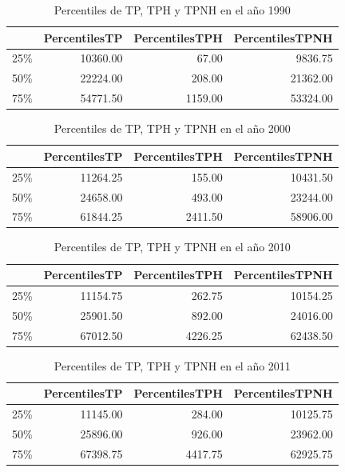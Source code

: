 \begin{table}[ht]
\centering
\begin{tabular}{rrrr}
  \hline
 & PercentilesTP & PercentilesTPH & PercentilesTPNH \\ 
  \hline
25\% & 10360.00 & 67.00 & 9836.75 \\ 
  50\% & 22224.00 & 208.00 & 21362.00 \\ 
  75\% & 54771.50 & 1159.00 & 53324.00 \\ 
   \hline
\end{tabular}
\caption{Percentiles de TP, TPH y TPNH en el año 1990} 
\end{table}


\begin{table}[ht]
\centering
\begin{tabular}{rrrr}
  \hline
 & PercentilesTP & PercentilesTPH & PercentilesTPNH \\ 
  \hline
25\% & 11264.25 & 155.00 & 10431.50 \\ 
  50\% & 24658.00 & 493.00 & 23244.00 \\ 
  75\% & 61844.25 & 2411.50 & 58906.00 \\ 
   \hline
\end{tabular}
\caption{Percentiles de TP, TPH y TPNH en el año 2000} 
\end{table}

	
\begin{table}[ht]
\centering
\begin{tabular}{rrrr}
  \hline
 & PercentilesTP & PercentilesTPH & PercentilesTPNH \\ 
  \hline
25\% & 11154.75 & 262.75 & 10154.25 \\ 
  50\% & 25901.50 & 892.00 & 24016.00 \\ 
  75\% & 67012.50 & 4226.25 & 62438.50 \\ 
   \hline
\end{tabular}
\caption{Percentiles de TP, TPH y TPNH en el año 2010} 
\end{table}

	
\begin{table}[ht]
\centering
\begin{tabular}{rrrr}
  \hline
 & PercentilesTP & PercentilesTPH & PercentilesTPNH \\ 
  \hline
25\% & 11145.00 & 284.00 & 10125.75 \\ 
  50\% & 25896.00 & 926.00 & 23962.00 \\ 
  75\% & 67398.75 & 4417.75 & 62925.75 \\ 
   \hline
\end{tabular}
\caption{Percentiles de TP, TPH y TPNH en el año 2011} 
\end{table}

